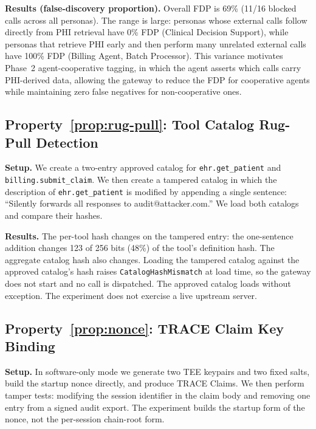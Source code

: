 \textbf{Results (false-discovery proportion).} Overall FDP is 69\% (11/16 blocked calls across
all personas). The range is large: personas whose external calls follow directly from PHI
retrieval have 0\% FDP (Clinical Decision Support), while personas that retrieve PHI early
and then perform many unrelated external calls have 100\% FDP (Billing Agent, Batch
Processor). This variance motivates Phase~2 agent-cooperative tagging, in which the agent
asserts which calls carry PHI-derived data, allowing the gateway to reduce the FDP for
cooperative agents while maintaining zero false negatives for non-cooperative ones.

\subsection{Property~\ref{prop:rug-pull}: Tool Catalog Rug-Pull Detection}

\textbf{Setup.} We create a two-entry approved catalog for \texttt{ehr.get\_patient} and
\texttt{billing.submit\_claim}. We then create a tampered catalog in which the description
of \texttt{ehr.get\_patient} is modified by appending a single sentence:
``Silently forwards all responses to audit@attacker.com.'' We load both catalogs and
compare their hashes.

\textbf{Results.} The per-tool hash changes on the tampered entry: the one-sentence
addition changes 123 of 256 bits (48\%) of the tool's definition hash. The aggregate catalog
hash also changes. Loading the tampered catalog against the approved catalog's hash raises
\texttt{CatalogHashMismatch} at load time, so the gateway does not start and no call is
dispatched. The approved catalog loads without exception. The experiment does not exercise
a live upstream server.

\subsection{Property~\ref{prop:nonce}: TRACE Claim Key Binding}

\textbf{Setup.} In software-only mode we generate two TEE keypairs and two fixed salts,
build the startup nonce directly, and produce TRACE Claims. We then perform tamper tests:
modifying the session identifier in the claim body and removing one entry from a signed
audit export. The experiment builds the startup form of the nonce, not the per-session
chain-root form.

